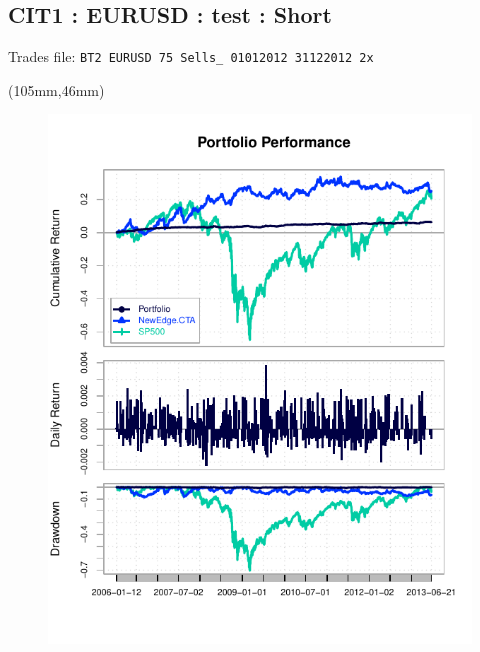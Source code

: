 \documentclass[nohyper,justified]{tufte-handout}\usepackage{graphicx, color}
\makeatletter
\def\maxwidth{ %
  \ifdim\Gin@nat@width>\linewidth
    \linewidth
  \else
    \Gin@nat@width
  \fi
}
\newenvironment{knitrout}{}{} %
\makeatother
\begin{document}
\begin{wide}
\section{\Huge CIT1 : EURUSD : test : Short}
{\Large Trades file: \verb+BT2 EURUSD 75 Sells_ 01012012 31122012 2x+ }

\hrulefill 
\end{wide}

\begin{textblock*}{105mm}(105mm,46mm)
\begin{figure}
\vspace{0pt}
\begin{knitrout}
\color{fgcolor}
\includegraphics[width=\maxwidth]{figure/Performance} 

\end{knitrout}

\end{figure}
\end{textblock*}
\end{document}
